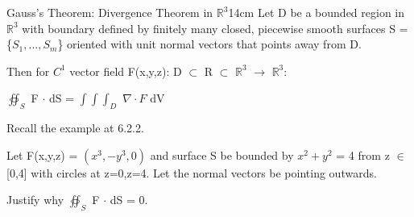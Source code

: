    \newpage



    \begin{wtheorem}{Gauss's Theorem: Divergence Theorem in $\mathbb{R}^3$}{14cm}
        Let D be a bounded region in $\mathbb{R}^3$ with boundary defined
        by finitely many closed, piecewise smooth surfaces S = \{$S_1,...,S_m$\}
        oriented with unit normal vectors that points away from D.

        Then for $C^1$ vector field F(x,y,z): D $\subset$ R $\subset$
        $\mathbb{R}^3$ $\rightarrow$ $\mathbb{R}^3$:

        \hspace{0.5cm}
        $\oiint_S$ F $\cdot$ dS
        = $\int \int \int_D$ $\nabla \cdot F$ dV
    \end{wtheorem}

    \vspace{0.5cm}



    \begin{example}
        Recall the example at 6.2.2.

        Let F(x,y,z) = $(x^3,-y^3,0)$ and surface S be bounded by
        $x^2+y^2$ = 4 from z $\in$ [0,4] with circles at z=0,z=4.
        Let the normal vectors be pointing outwards.

        Justify why $\oiint_S$ F $\cdot$ dS = 0. 
    \end{example}

